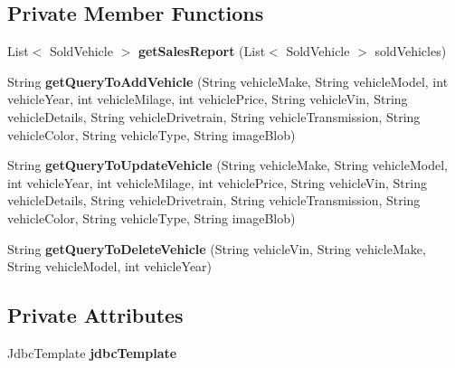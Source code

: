 \subsection*{Private Member Functions}
\begin{DoxyCompactItemize}
\item 
\mbox{\label{classrepository_1_1_administrator_repository_ab72d97fba31cd2583bbe053fd691ce32}} 
List$<$ Sold\+Vehicle $>$ {\bfseries get\+Sales\+Report} (List$<$ Sold\+Vehicle $>$ sold\+Vehicles)
\item 
\mbox{\label{classrepository_1_1_administrator_repository_a19ae4d40e3049a85299e1ccecd499627}} 
String {\bfseries get\+Query\+To\+Add\+Vehicle} (String vehicle\+Make, String vehicle\+Model, int vehicle\+Year, int vehicle\+Milage, int vehicle\+Price, String vehicle\+Vin, String vehicle\+Details, String vehicle\+Drivetrain, String vehicle\+Transmission, String vehicle\+Color, String vehicle\+Type, String image\+Blob)
\item 
\mbox{\label{classrepository_1_1_administrator_repository_ae023bf57638e837de711e8fc60f7cdf0}} 
String {\bfseries get\+Query\+To\+Update\+Vehicle} (String vehicle\+Make, String vehicle\+Model, int vehicle\+Year, int vehicle\+Milage, int vehicle\+Price, String vehicle\+Vin, String vehicle\+Details, String vehicle\+Drivetrain, String vehicle\+Transmission, String vehicle\+Color, String vehicle\+Type, String image\+Blob)
\item 
\mbox{\label{classrepository_1_1_administrator_repository_a60d62af7a4681de7e112b25552540955}} 
String {\bfseries get\+Query\+To\+Delete\+Vehicle} (String vehicle\+Vin, String vehicle\+Make, String vehicle\+Model, int vehicle\+Year)
\end{DoxyCompactItemize}
\subsection*{Private Attributes}
\begin{DoxyCompactItemize}
\item 
\mbox{\label{classrepository_1_1_administrator_repository_a6fccfae3a5233d32948b6cfab9372cc9}} 
Jdbc\+Template {\bfseries jdbc\+Template}
\end{DoxyCompactItemize}
